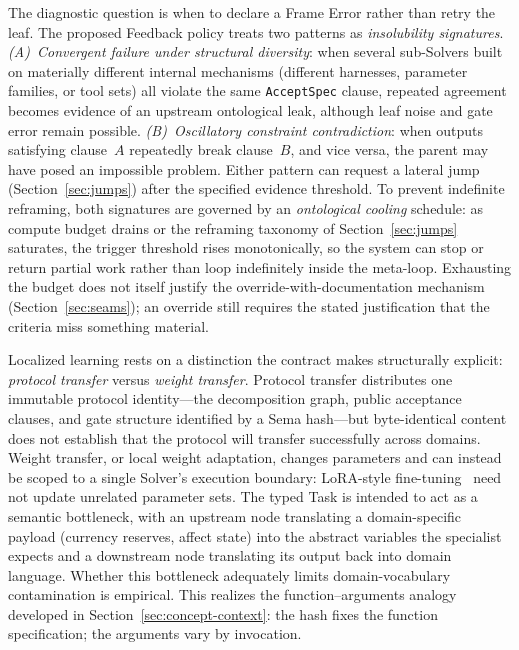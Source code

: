 \documentclass[11pt]{article}
\let\oldtexttt\texttt
\renewcommand{\texttt}[1]{\oldtexttt{\small #1}}
\begin{document}
The diagnostic question is when to declare a Frame Error rather than retry the leaf. The proposed Feedback policy treats two patterns as \emph{insolubility signatures}. \emph{(A)~Convergent failure under structural diversity}: when several sub-Solvers built on materially different internal mechanisms (different harnesses, parameter families, or tool sets) all violate the same \texttt{AcceptSpec} clause, repeated agreement becomes evidence of an upstream ontological leak, although leaf noise and gate error remain possible. \emph{(B)~Oscillatory constraint contradiction}: when outputs satisfying clause~$A$ repeatedly break clause~$B$, and vice versa, the parent may have posed an impossible problem. Either pattern can request a lateral jump (Section~\ref{sec:jumps}) after the specified evidence threshold. To prevent indefinite reframing, both signatures are governed by an \emph{ontological cooling} schedule: as compute budget drains or the reframing taxonomy of Section~\ref{sec:jumps} saturates, the trigger threshold rises monotonically, so the system can stop or return partial work rather than loop indefinitely inside the meta-loop. Exhausting the budget does not itself justify the override-with-documentation mechanism (Section~\ref{sec:seams}); an override still requires the stated justification that the criteria miss something material.

Localized learning rests on a distinction the contract makes structurally explicit: \emph{protocol transfer} versus \emph{weight transfer}. Protocol transfer distributes one immutable protocol identity---the decomposition graph, public acceptance clauses, and gate structure identified by a Sema hash---but byte-identical content does not establish that the protocol will transfer successfully across domains. Weight transfer, or local weight adaptation, changes parameters and can instead be scoped to a single Solver's execution boundary: LoRA-style fine-tuning~\cite{hu2022lora} need not update unrelated parameter sets. The typed Task is intended to act as a semantic bottleneck, with an upstream node translating a domain-specific payload (currency reserves, affect state) into the abstract variables the specialist expects and a downstream node translating its output back into domain language. Whether this bottleneck adequately limits domain-vocabulary contamination is empirical. This realizes the function--arguments analogy developed in Section~\ref{sec:concept-context}: the hash fixes the function specification; the arguments vary by invocation.
\end{document}
